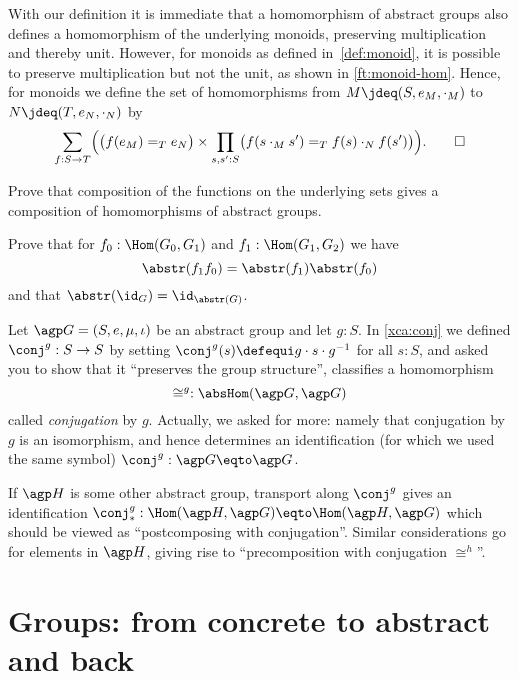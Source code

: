 \begin{remark}\label{rem:monoid-hom}
  With our definition it is immediate that a homomorphism of abstract
  groups also defines a homomorphism of the underlying monoids,
  preserving multiplication and thereby unit. However,
  for monoids as defined in~\cref{def:monoid}, it is possible to preserve
  multiplication but not the unit, as shown in \cref{ft:monoid-hom}.
  Hence, for monoids we define the set of homomorphisms
  from $M \jdeq (S,e_M,\cdot_M)$ to $N \jdeq(T,e_N,\cdot_N)$ by
  \[
    \sum_{f:S\to T}\Bigl(\bigl(f(e_M) =_T e_N\bigr)\times
    \prod_{s,s':S}\bigl(f(s\cdot_M s')=_T f(s)\cdot_N f(s')\bigr)\Bigr).%
    \qedhere
  \]
\end{remark}

\begin{xca}
Prove that composition of the functions on the underlying sets gives a composition of homomorphisms of abstract groups.

  Prove that for $f_0:\Hom(G_0,G_1)$ and $f_1:\Hom(G_1,G_2)$ we have
  $$\abstr(f_1f_0)=\abstr(f_1)\abstr(f_0)$$ and that 
  $\abstr(\id_G)=\id_{\abstr(G)}$.
\end{xca}

\begin{example}
  \label{ex:conjhom}
  Let $\agp G=(S,e,\mu,\iota)$ be an abstract group and let $g:S$. 
  In \cref{xca:conj} we defined $\conj^g:S\to S$ by setting 
  $\conj^g(s)\defequi g\cdot s\cdot g^{-1}$ for all $s:S$,
  and asked you to show that it ``preserves the group structure'',
  \ie classifies a homomorphism
  \[
    \cong^g:\absHom(\agp G,\agp G)
  \]
  called \emph{conjugation} by $g$.
  Actually, we asked for more: namely that conjugation by $g$ is 
  an isomorphism, and hence determines an identification
  (for which we used the same symbol) $\conj^g:\agp G\eqto\agp G$.

  If $\agp H$ is some other abstract group, transport along $\conj^g$
  gives an identification
  $\conj^g_*:\Hom(\agp H,\agp G) \eqto \Hom(\agp H,\agp G)$
  which should be viewed as ``postcomposing with conjugation''.
  Similar considerations go for elements in $\agp H$,
  giving rise to ``precomposition with conjugation $\cong^h$''.
\end{example}

\section{Groups: from concrete to abstract and back}
\label{sec:Gsetforabstract}

